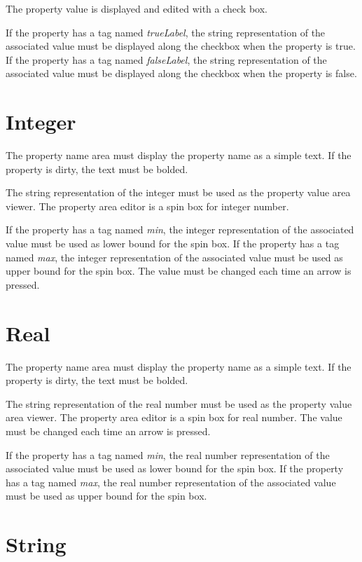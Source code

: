 \documentclass[a4paper, twoside]{report}
\begin{document}
The property value is displayed and edited with a check box.

If the property has a tag named \emph{trueLabel}, the string representation of the associated value
must be displayed along the checkbox when the property is true.
If the property has a tag named \emph{falseLabel}, the string representation of the associated value
must be displayed along the checkbox when the property is false.

\section{Integer}

The property name area must display the property name as a simple text. If the property is dirty,
the text must be bolded.

The string representation of the integer must be used as the property value area viewer.
The property area editor is a spin box for integer number.

If the property has a tag named \emph{min}, the integer representation of the associated value must
be used as lower bound for the spin box.
If the property has a tag named \emph{max}, the integer representation of the associated value must
be used as upper bound for the spin box. The value must be changed each time an arrow is pressed.

\section{Real}

The property name area must display the property name as a simple text. If the property is dirty,
the text must be bolded.

The string representation of the real number must be used as the property value area viewer.
The property area editor is a spin box for real number. The value must be changed each time an arrow
is pressed.

If the property has a tag named \emph{min}, the real number representation of the associated value must be used as lower bound for the spin box.
If the property has a tag named \emph{max}, the real number representation of the associated value must be used as upper bound for the spin box.

\section{String}
\end{document}
